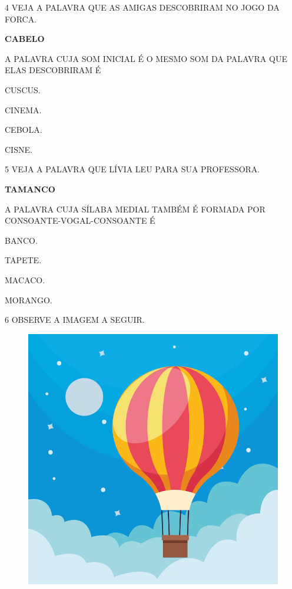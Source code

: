 \num{4} VEJA A PALAVRA QUE AS AMIGAS DESCOBRIRAM NO JOGO DA FORCA.

\begin{center}
\textbf{CABELO}
\end{center}

A PALAVRA CUJA SOM INICIAL É O MESMO SOM DA PALAVRA QUE ELAS DESCOBRIRAM É

\begin{escolha}

\item CUSCUS.

\item CINEMA.

\item CEBOLA.

\item CISNE.

\end{escolha}

\num{5} VEJA A PALAVRA QUE LÍVIA LEU PARA SUA PROFESSORA.

\begin{center}
\textbf{TAMANCO}
\end{center}

A PALAVRA CUJA SÍLABA MEDIAL TAMBÉM É FORMADA POR CONSOANTE-VOGAL-CONSOANTE É

\begin{escolha}

\item BANCO.

\item TAPETE.

\item MACACO.

\item MORANGO.

\end{escolha}

\num{6} OBSERVE A IMAGEM A SEGUIR.

\begin{figure}[H]
\centering
\includegraphics[width=.7\textwidth]{./media/image232.png}
\end{figure}

